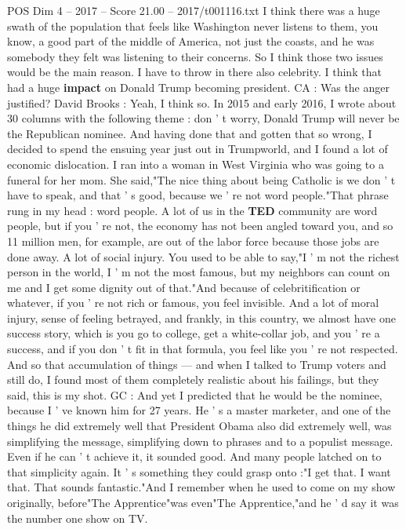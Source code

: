 \begin{textsample}{POS Dim 4 – 2017 – Score 21.00 – 2017/t001116.txt}
I think there was a huge swath of the population that feels like Washington never listens to them, you know, a good part of the middle of America, not just the coasts, and he was somebody they felt was listening to their concerns.
So I think those two issues would be the main reason.
I have to throw in there also celebrity.
I think that had a huge \textbf{impact} on Donald Trump becoming president.
CA : Was the anger justified?
David Brooks : Yeah, I think so.
In 2015 and early 2016, I wrote about 30 columns with the following theme : don ' t worry, Donald Trump will never be the Republican nominee.
And having done that and gotten that so wrong, I decided to spend the ensuing year just out in Trumpworld, and I found a lot of economic dislocation.
I ran into a woman in West Virginia who was going to a funeral for her mom.
She said,"The nice thing about being Catholic is we don ' t have to speak, and that ' s good, because we ' re not word people."That phrase rung in my head : word people.
A lot of us in the \textbf{TED} community are word people, but if you ' re not, the economy has not been angled toward you, and so 11 million men, for example, are out of the labor force because those jobs are done away.
A lot of social injury.
You used to be able to say,"I ' m not the richest person in the world, I ' m not the most famous, but my neighbors can count on me and I get some dignity out of that."And because of celebritification or whatever, if you ' re not rich or famous, you feel invisible.
And a lot of moral injury, sense of feeling betrayed, and frankly, in this country, we almost have one success story, which is you go to college, get a white-collar job, and you ' re a success, and if you don ' t fit in that formula, you feel like you ' re not respected.
And so that accumulation of things — and when I talked to Trump voters and still do, I found most of them completely realistic about his failings, but they said, this is my shot.
GC : And yet I predicted that he would be the nominee, because I ' ve known him for 27 years.
He ' s a master marketer, and one of the things he did extremely well that President Obama also did extremely well, was simplifying the message, simplifying down to phrases and to a populist message.
Even if he can ' t achieve it, it sounded good.
And many people latched on to that simplicity again.
It ' s something they could grasp onto :"I get that.
I want that.
That sounds fantastic."And I remember when he used to come on my show originally, before"The Apprentice"was even"The Apprentice,"and he ' d say it was the number one show on TV.

\end{textsample}
